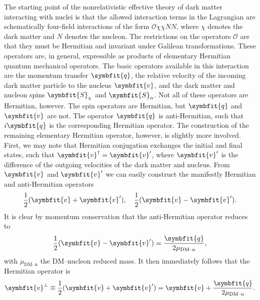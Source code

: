 \documentclass[b5paper, 10pt, twoside]{book}
\renewcommand{\vec}[1]{\symbfit{#1}}
\begin{document}
The starting point of the nonrelativistic effective theory of dark matter interacting with nuclei is that the allowed interaction terms in the Lagrangian are schematically four-field interactions of the form $\mathcal{O}\chi\chi NN$, where $\chi$ denotes the dark matter and $N$ denotes the nucleon. The restrictions on the operators $\mathcal{O}$ are that they must be Hermitian and invariant under Galilean transformations. These operators are, in general, expressible as products of elementary Hermitian quantum mechanical operators. The basic operators available in this interaction are the momentum transfer $\vec{q}$, the relative velocity of the incoming dark matter particle to the nucleus $\vec{v}$, and the dark matter and nucleon spins $\vec{S}_\chi$ and $\vec{S}_n$. Not all of these operators are Hermitian, however. The spin operators are Hermitian, but $\vec{q}$ and $\vec{v}$ are not. The operator $\vec{q}$ is anti-Hermitian, such that $i\vec{q}$ is the corresponding Hermitian operator. The construction of the remaining elementary Hermitian operator, however, is slightly more involved. First, we may note that Hermitian conjugation exchanges the initial and final states, such that $\vec{v}^\dagger=\vec{v}'$, where $\vec{v}'$ is the difference of the outgoing velocities of the dark matter and nucleus. From $\vec{v}$ and $\vec{v}'$ we can easily construct the manifestly Hermitian and anti-Hermitian operators
\begin{equation}
    \frac{1}{2}(\vec{v}+\vec{v}'),\quad\frac{1}{2}(\vec{v}-\vec{v}').
\end{equation}
It is clear by momentum conservation that the anti-Hermitian operator reduces to
\begin{equation}
    \frac{1}{2}(\vec{v}-\vec{v}')=\frac{\vec{q}}{2\mu_\text{DM--n}},
\end{equation}
with $\mu_\text{DM--n}$ the DM--nucleon reduced mass. It then immediately follows that the Hermitian operator is
\begin{equation}
    \vec{v}^\perp\equiv\frac{1}{2}(\vec{v}+\vec{v}')=\vec{v}+\frac{\vec{q}}{2\mu_\text{DM--n}}.
\end{equation}
\end{document}
